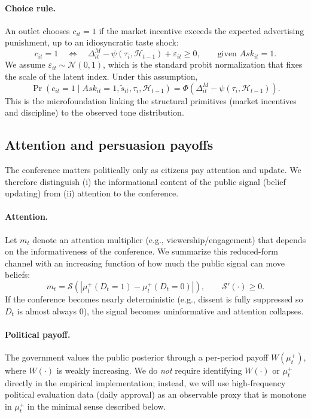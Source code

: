 \documentclass[12pt]{article}
\begin{document}
\paragraph{Choice rule.}
An outlet chooses $c_{it}=1$ if the market incentive exceeds the expected advertising punishment, up to an idiosyncratic taste shock:
\[
c_{it}=1
\quad\Longleftrightarrow\quad
\Delta^{M}_{it}-\psi(\tau_i,\mathcal{H}_{t-1})+\varepsilon_{it}\ge 0,
\qquad\text{given } Ask_{it}=1.
\]
We assume $\varepsilon_{it}\sim \mathcal{N}(0,1)$, which is the standard probit normalization that fixes the scale of the latent index. Under this assumption,
\begin{equation}\label{eq:probit_choice}
\Pr(c_{it}=1\mid Ask_{it}=1,\tilde{s}_{it},\tau_i,\mathcal{H}_{t-1})
=
\Phi\!\left(\Delta^{M}_{it}-\psi(\tau_i,\mathcal{H}_{t-1})\right).
\end{equation}
This is the microfoundation linking the structural primitives (market incentives and discipline) to the observed tone distribution.

\subsection{Attention and persuasion payoffs}

The conference matters politically only as citizens pay attention and update. We therefore distinguish (i) the informational content of the public signal (belief updating) from (ii) attention to the conference.

\paragraph{Attention.}
Let $m_t$ denote an attention multiplier (e.g., viewership/engagement) that depends on the informativeness of the conference. We summarize this reduced-form channel with an increasing function of how much the public signal can move beliefs:
\[
m_t=\mathcal{S}\!\left(\left|\mu_t^+(D_t=1)-\mu_t^+(D_t=0)\right|\right),
\qquad \mathcal{S}'(\cdot)\ge 0.
\]
If the conference becomes nearly deterministic (e.g., dissent is fully suppressed so $D_t$ is almost always $0$), the signal becomes uninformative and attention collapses.

\paragraph{Political payoff.}
The government values the public posterior through a per-period payoff $W(\mu_t^+)$, where $W(\cdot)$ is weakly increasing. We do \emph{not} require identifying $W(\cdot)$ or $\mu_t^+$ directly in the empirical implementation; instead, we will use high-frequency political evaluation data (daily approval) as an observable proxy that is monotone in $\mu_t^+$ in the minimal sense described below.
\end{document}
